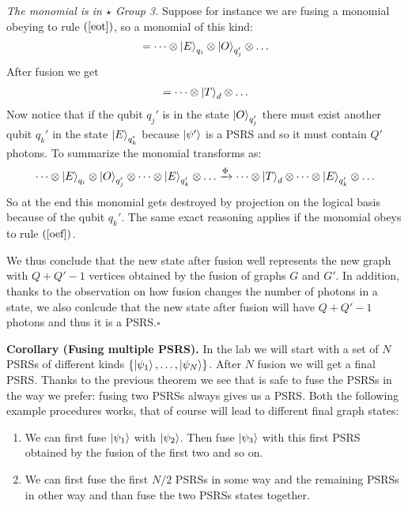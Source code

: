 \documentclass{article}
\begin{document}
\textit{The monomial is in $\star$ Group 3.}  Suppose  for instance we are fusing a monomial obeying to rule $(\ref{eot})$, so a monomial of this kind:
\begin{align*}
   [\dots, q^{(i)}_H=0, q^{(i)}_V=0, q'^{(j)}_H=1, q'^{(j)}_V=1, \dots] = \dots \otimes \ket{E}_{q_i} \otimes \ket{O}_{q'_j}\otimes\dots
\end{align*} 
After fusion we get
\begin{align*}
   [\dots, d_H=0, d_H = 1, \dots] = \dots \otimes \ket{T}_d \otimes \dots
\end{align*} 
Now notice that if the qubit $q_j'$ is in the state $\ket{O}_{q_j'}$ there must exist another qubit $q_k'$ in the state $\ket{E}_{q_k'}$ because $\ket{\psi'}$ is a PSRS and so it must contain $Q'$ photons. To summarize the monomial transforms as:
\begin{align*}
    \dots \otimes \ket{E}_{q_i} \otimes \ket{O}_{q'_j}\otimes\dots \otimes \ket{E}_{q'_k} \otimes \dots
    \xrightarrow{\Phi}\dots \otimes \ket{T}_{d}\otimes\dots \otimes \ket{E}_{q'_k} \otimes \dots
\end{align*}
So at the end this monomial gets destroyed by projection on the logical basis because of the qubit $q_k'$.
The same exact reasoning applies if the monomial obeys to rule $(\ref{oef})$.

We thus conclude that the new state after fusion well represents the new graph with $Q+Q'-1$ vertices obtained by the fusion of graphs $G$ and $G'$. In addition, thanks to the observation on how fusion changes the number of photons in a state, we also conlcude that the new state after fusion will have $Q+Q'-1$ photons and thus it is a PSRS.\hfill$\square$

\textbf{Corollary (Fusing multiple PSRS).} In the lab we will start with a set of $N$ PSRSs of different kinds $\{\ket{\psi_1}, \dots, \ket{\psi_N}\}$. After $N$ fusion we will get a final PSRS. Thanks to the previous theorem we see that is safe to fuse the PSRSs in the way we prefer: fusing two PSRSs always gives us a PSRS. Both the following example procedures works, that of course will lead to different final graph states:
\begin{enumerate}
    \item We can first fuse $\ket{\psi_1}$ with $\ket{\psi_2}$. Then fuse $\ket{\psi_3}$ with this first PSRS obtained by the fusion of the first two and so on.
    \item We can first fuse the first $N/2$ PSRSs in some way and the remaining PSRSs in other way and than fuse the two PSRSs states together.
\end{enumerate}
\end{document}

